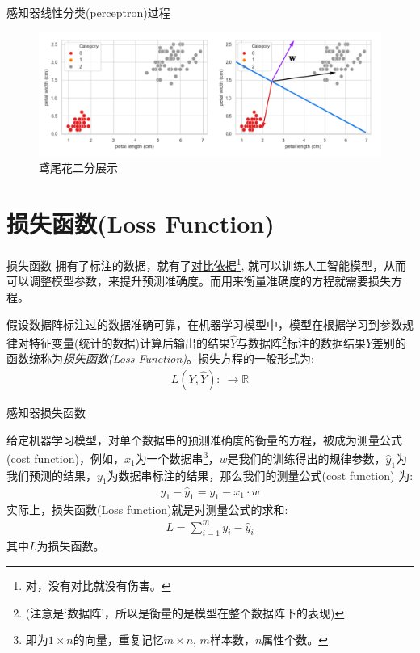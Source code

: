 \documentclass[handout]{ctexbeamer}
\newcommand{\rn}{\mathbb{R}}
\begin{document}
\begin{frame}{感知器线性分类(perceptron)过程}
	\begin{figure}[H]
		\centering
		\includegraphics[width=\textwidth]{fig/C2prevIris2}
		\caption{鸢尾花二分展示}
	\end{figure}
\end{frame}


\section{损失函数(Loss Function)}

\begin{frame}{损失函数}
拥有了标注的数据，就有了\underline{对比依据}\footnote[frame]{对，没有对比就没有伤害。}, 就可以训练人工智能模型，从而可以调整模型参数，来提升预测准确度。而用来衡量准确度的方程就需要损失方程。

\hfil

\begin{definition}
	假设数据阵标注过的数据准确可靠，在机器学习模型中，模型在根据学习到参数规律对特征变量(统计的数据)计算后输出的结果$\hat{Y}$与数据阵\footnote{(注意是`数据阵'，所以是衡量的是模型在整个数据阵下的表现)}标注的数据结果$Y$差别的函数统称为\textit{损失函数(Loss Function)}。损失方程的一般形式为:
\begin{align*}
	L(Y, \hat{Y}): \ \to \rn 
\end{align*}	
\end{definition}
\end{frame}

\begin{frame}{感知器损失函数}
\begin{definition}
	给定机器学习模型，对单个数据串的预测准确度的衡量的方程，被成为测量公式(cost function)，例如，$x_1$为一个数据串\footnote{即为$1 \times n$的向量，重复记忆$m \times n$, $m$样本数，$n$属性个数。}，$w$是我们的训练得出的规律参数，$\hat{y}_1$为我们预测的结果，$y_1$为数据串标注的结果，那么我们的测量公式(cost function) 为:
	\begin{align*}
		y_1 - \hat{y}_1 = y_1 - x_1 \cdot w 
	\end{align*}
	实际上，损失函数(Loss function)就是对测量公式的求和:
	\begin{align*}
		L = \sum_{i=1}^m y_i - \hat{y}_i 
	\end{align*}
	其中$L$为损失函数。
\end{definition}
\end{frame}
\end{document}
